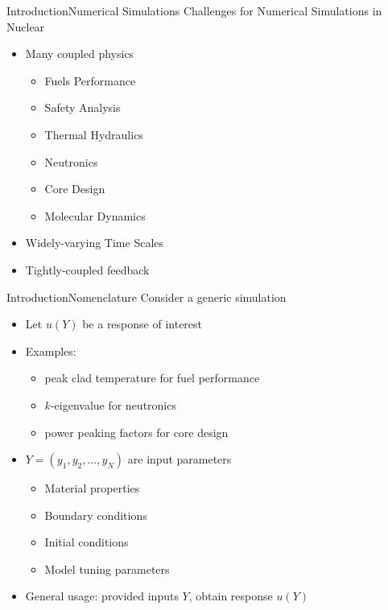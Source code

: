 \documentclass{beamer}
\begin{document}
\begin{frame}{Introduction}{Numerical Simulations}\vspace{-20pt}
  \vfill
  Challenges for Numerical Simulations in Nuclear
  \vfill
  \begin{itemize}
    \item Many coupled physics
      \begin{itemize}
        \item Fuels Performance
        \item Safety Analysis
        \item Thermal Hydraulics
        \item Neutronics
        \item Core Design
        \item Molecular Dynamics
      \end{itemize}
  \vfill
    \item Widely-varying Time Scales
  \vfill
    \item Tightly-coupled feedback
  \end{itemize}
  \vfill
\end{frame}


\begin{frame}{Introduction}{Nomenclature}\vspace{-10pt}
  Consider a generic simulation
  \begin{itemize}
    \item Let $u(Y)$ be a response of interest
    \item Examples:
      \begin{itemize}
        \item peak clad temperature for fuel performance
        \item $k$-eigenvalue for neutronics
        \item power peaking factors for core design
      \end{itemize}
    \item $Y=(y_1,y_2,\ldots,y_N)$ are input parameters
      \begin{itemize}
        \item Material properties
        \item Boundary conditions
        \item Initial conditions
        \item Model tuning parameters
      \end{itemize}
    \item General usage: provided inputs $Y$, obtain response $u(Y)$
  \end{itemize}
\end{frame}
\end{document}

